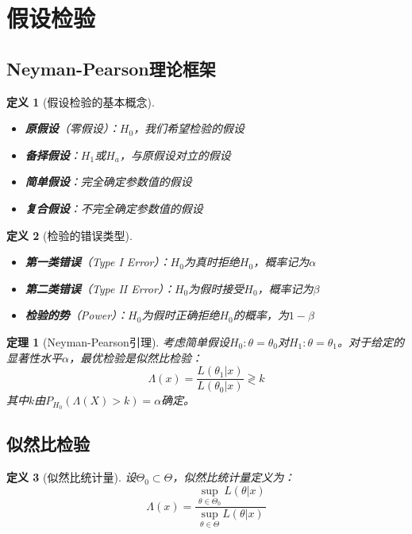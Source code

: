 \documentclass[12pt,a4paper]{article}
\newtheorem{theorem}{定理}[section]
\newtheorem{definition}{定义}[section]
\theoremstyle{remark}
\begin{document}
\section{假设检验}

\subsection{Neyman-Pearson理论框架}

\begin{definition}[假设检验的基本概念]
\begin{itemize}
\item \textbf{原假设}（零假设）：$H_0$，我们希望检验的假设
\item \textbf{备择假设}：$H_1$或$H_a$，与原假设对立的假设
\item \textbf{简单假设}：完全确定参数值的假设
\item \textbf{复合假设}：不完全确定参数值的假设
\end{itemize}
\end{definition}

\begin{definition}[检验的错误类型]
\begin{itemize}
\item \textbf{第一类错误}（Type I Error）：$H_0$为真时拒绝$H_0$，概率记为$\alpha$
\item \textbf{第二类错误}（Type II Error）：$H_0$为假时接受$H_0$，概率记为$\beta$
\item \textbf{检验的势}（Power）：$H_0$为假时正确拒绝$H_0$的概率，为$1-\beta$
\end{itemize}
\end{definition}

\begin{theorem}[Neyman-Pearson引理]
考虑简单假设$H_0: \theta = \theta_0$对$H_1: \theta = \theta_1$。对于给定的显著性水平$\alpha$，最优检验是似然比检验：
$$\Lambda(x) = \frac{L(\theta_1|x)}{L(\theta_0|x)} \gtrless k$$
其中$k$由$P_{H_0}(\Lambda(X) > k) = \alpha$确定。
\end{theorem}

\subsection{似然比检验}

\begin{definition}[似然比统计量]
设$\Theta_0 \subset \Theta$，似然比统计量定义为：
$$\Lambda(x) = \frac{\sup_{\theta \in \Theta_0} L(\theta|x)}{\sup_{\theta \in \Theta} L(\theta|x)}$$
\end{definition}
\end{document}
